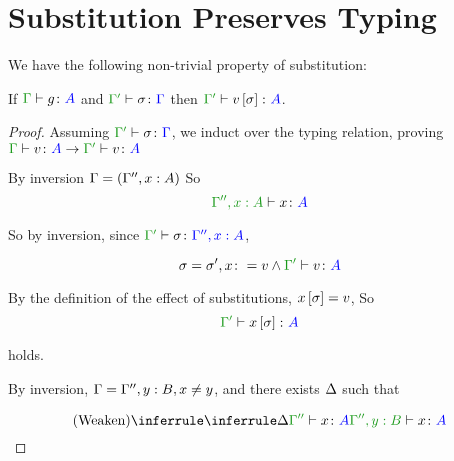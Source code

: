 \documentclass{report}
\begin{document}
   
    

\section{Substitution Preserves Typing}
We have the following non-trivial property of substitution:


\begin{theorem}

    If $\typerelation{\G}{g}{A}$ and $\typerelation{\G'}{\si}{\G}$ then $\typerelation{\G'}{v\ssi}{A}$.
\end{theorem}



\begin{framed}
    \begin{proof}
        
        Assuming $\typerelation{\G'}{\si}{\G}$, we induct over the typing relation, proving $\gtyperelation{v}{A}\rightarrow\typerelation{\G'}{v}{A}$
        
                By inversion $\Gamma = (\Gamma'', x:A)$
                So \begin{equation}
                    \typerelation{\G'',x:A}{x}{A}
                \end{equation}
        
                So by inversion, since $\typerelation{\G'}{\si}{\G'', x:A}$, 
        
                \begin{equation}
                    \si = \si', x\setto v \wedge \typerelation{\G'}{v}{A}
                \end{equation}
        
                By the definition of the effect of substitutions, $x\left[\sigma\right] = v$, So
                \begin{equation}
                    \typerelation{\G'}{x\ssi}{A}
                \end{equation}
        
                holds.
                
                By inversion, $\Gamma = \Gamma'', y: B, x \neq y$, and there exists $\Delta$ such that
        
                \begin{equation}
                    \ntreeruleI{Weaken}{\treeruleI{\D}{\typerelation{\G''}{x}{A}}}{\typerelation{\G'', y: B}{x}{A}}
                \end{equation}
        

\end{proof}
\end{framed}
\end{document}
